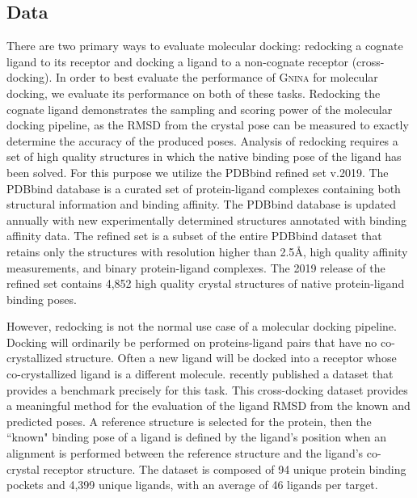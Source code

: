 \documentclass[journal=jcisd8,manuscript=article]{achemso}
\begin{document}
\subsection{Data}
There are two primary ways to evaluate molecular docking: redocking a cognate ligand to its receptor and docking a ligand to a non-cognate receptor (cross-docking). In order to best evaluate the performance of \textsc{Gnina} for molecular docking, we evaluate its performance on both of these tasks. Redocking the cognate ligand demonstrates the sampling and scoring power of the molecular docking pipeline, as the RMSD from the crystal pose can be measured to exactly determine the accuracy of the produced poses. Analysis of redocking requires a set of high quality structures in which the native binding pose of the ligand has been solved. For this purpose we utilize the PDBbind refined set v.2019\cite{liu2017forging}. The PDBbind database is a curated set of protein-ligand complexes containing both structural information and binding affinity. The PDBbind database is updated annually with new experimentally determined structures annotated with binding affinity data. The refined set is a subset of the entire PDBbind dataset that retains only the structures with resolution higher than 2.5{\AA}, high quality affinity measurements, and binary protein-ligand complexes. The 2019 release of the refined set contains 4,852 high quality crystal structures of native protein-ligand binding poses. 

However, redocking is not the normal use case of a molecular docking pipeline. Docking will ordinarily be performed on proteins-ligand pairs that have no co-crystallized structure. Often a new ligand will be docked into a receptor whose co-crystallized ligand is a different molecule. \citet{wierbowski2020cross} recently published a dataset that provides a benchmark precisely for this task. This cross-docking dataset provides a meaningful method for the evaluation of the ligand RMSD from the known and predicted poses. A reference structure is selected for the protein, then the ``known" binding pose of a ligand is defined by the ligand's position when an alignment is performed between the reference structure and the ligand's co-crystal receptor structure. The dataset is composed of 94 unique protein binding pockets and 4,399 unique ligands, with an average of 46 ligands per target.
\end{document}
